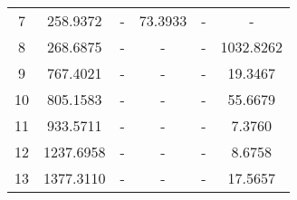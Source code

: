 \begin{table}[H]
\begin{adjustbox}{width=1.3\textwidth, center}
\begin{tabular}{S[table-format=2.0] S[table-format=4.4] S[table-format=6.4] S[table-format=2.4] S S[table-format=4.4]}
			7                & {258.9372 }                   & {-}                                        & {73.3933 }                       & {-}                                         & {-}                                         \\
			8                & {268.6875 }                   & {-}                                        & {-}                                         & {-}                                         & {1032.8262 }                    \\
			9                & {767.4021 }                   & {-}                                        & {-}                                         & {-}                                         & {19.3467 }                        \\
			10               & {805.1583 }                   & {-}                                        & {-}                                         & {-}                                         & {55.6679 }                        \\
			11               & {933.5711 }                   & {-}                                        & {-}                                         & {-}                                         & {7.3760 }                         \\
			12               & {1237.6958 }                  & {-}                                        & {-}                                         & {-}                                         & {8.6758 }                         \\
			13               & {1377.3110 }                  & {-}                                        & {-}                                         & {-}                                         & {17.5657 }                        \\
			\bottomrule
		\end{tabular}
	\end{adjustbox}
\end{table}
\noindent
